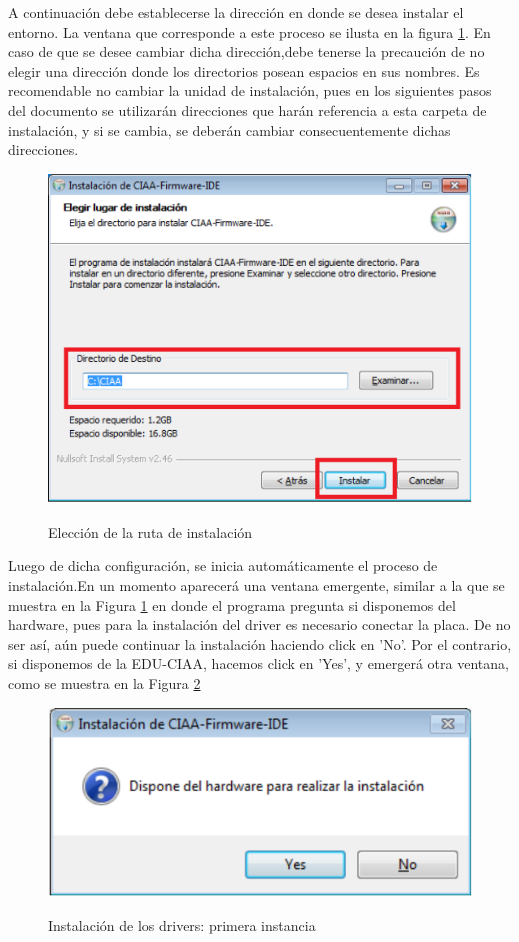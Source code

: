\documentclass[12pt,letterpaper]{article}
\begin{document}
A continuación debe  establecerse la dirección en donde se desea instalar el entorno. La ventana que corresponde a este proceso se ilusta en la figura \ref{Fig6}. En caso de que se desee cambiar dicha dirección,debe tenerse la precaución de no elegir una dirección donde los directorios posean espacios en sus nombres. Es recomendable no cambiar la unidad de instalación, pues en los siguientes pasos del documento se utilizarán direcciones que harán referencia a esta carpeta de instalación, y si se cambia, se deberán cambiar consecuentemente dichas direcciones.

\begin{center}
\begin{figure}[!h]
\centering
\includegraphics[width=8 cm]{figuras/instalacion4.png}\\
\caption{Elección de la ruta de instalación}
\label{Fig6}
\end{figure}
\end{center}

Luego de dicha configuración, se inicia automáticamente el proceso de instalación.En un momento aparecerá una
ventana emergente, similar a la que se muestra en la Figura \ref{Fig6} en donde el programa pregunta si disponemos del hardware, pues para la instalación del driver es necesario conectar la placa. De no  ser así, aún puede continuar la instalación haciendo click en 'No'. Por el contrario, si disponemos de la EDU-CIAA, hacemos click en 'Yes', y emergerá otra ventana, como se muestra en la Figura \ref{Fig7}

\begin{center}
\begin{figure}[!h]
\centering
\includegraphics[width=8 cm]{figuras/instalacion5.png}\\
\caption{Instalación de los drivers: primera instancia}
\label{Fig7}
\end{figure}
\end{center}
\end{document}
